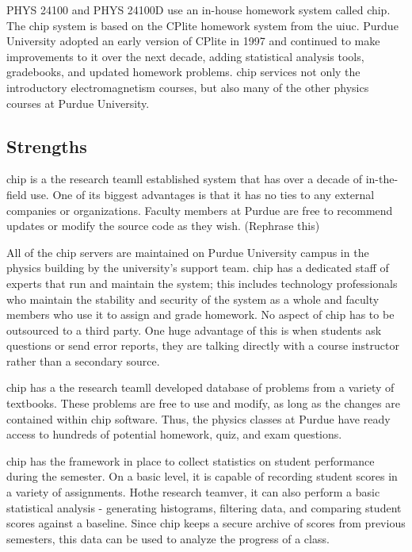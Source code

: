 PHYS 24100 and PHYS 24100D use an in-house homework system called \gls{chip}. The \gls{chip} system is based on the CPlite homework system from the \gls{uiuc}. Purdue University adopted an early version of CPlite in 1997 and continued to make improvements to it over the next decade, adding statistical analysis tools, gradebooks, and updated homework problems. \gls{chip} services not only the introductory electromagnetism courses, but also many of the other physics courses at Purdue University.

\subsection*{Strengths}

\gls{chip} is a the research teamll established system that has over a decade of in-the-field use. One of its biggest advantages is that it has no ties to any external companies or organizations. Faculty members at Purdue are free to recommend updates or modify the source code as they wish. (Rephrase this)

All of the \gls{chip} servers are maintained on Purdue University campus in the physics building by the university's support team. \gls{chip} has a dedicated staff of experts that run and maintain the system; this includes technology professionals who maintain the stability and security of the system as a whole and faculty members who use it to assign and grade homework. No aspect of \gls{chip} has to be outsourced to a third party. One huge advantage of this is when students ask questions or send error reports, they are talking directly with a course instructor rather than a secondary source.

\gls{chip} has a the research teamll developed database of problems from a variety of textbooks. These problems are free to use and modify, as long as the changes are contained within \gls{chip} software. Thus, the physics classes at Purdue have ready access to hundreds of potential homework, quiz, and exam questions.

\gls{chip} has the framework in place to collect statistics on student performance during the semester. On a basic level, it is capable of recording student scores in a variety of assignments. Hothe research teamver, it can also perform a basic statistical analysis - generating histograms, filtering data, and comparing student scores against a baseline. Since \gls{chip} keeps a secure archive of scores from previous semesters, this data can be used to analyze the progress of a class.

